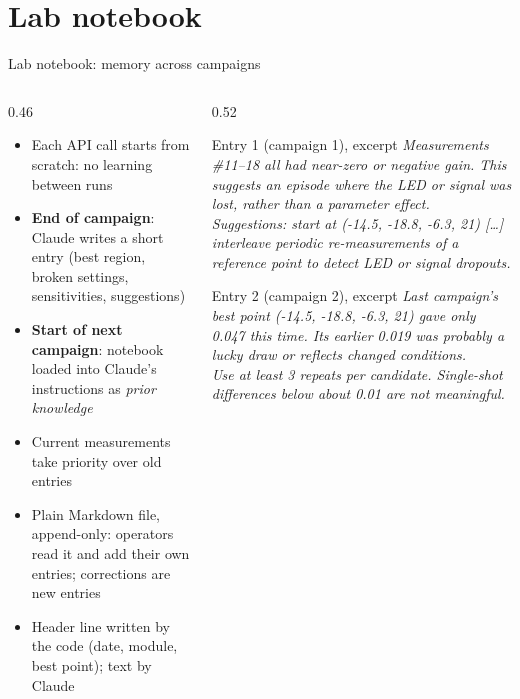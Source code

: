 \documentclass[aspectratio=169,10pt]{beamer}
\begin{document}
\section{Lab notebook}

\begin{frame}{Lab notebook: memory across campaigns}
  \begin{columns}[T]
    \begin{column}{0.46\textwidth}
      \small
      \begin{itemize}
        \item Each API call starts from scratch: no learning between runs
        \item \textbf{End of campaign}: Claude writes a short entry
              (best region, broken settings, sensitivities, suggestions)
        \item \textbf{Start of next campaign}: notebook loaded into Claude's
              instructions as \emph{prior knowledge}
        \item Current measurements take priority over old entries
        \item Plain Markdown file, append-only: operators read it and add their own entries; corrections are new entries
        \item Header line written by the code (date, module, best point);
              text by Claude
      \end{itemize}
    \end{column}
    \begin{column}{0.52\textwidth}
      \scriptsize
      \begin{block}{Entry 1 (campaign 1), excerpt}
        \emph{Measurements \#11--18 all had near-zero or negative gain. This suggests an
        episode where the LED or signal was lost, rather than a parameter effect.}\\[1mm]
        \emph{Suggestions: start at (-14.5, -18.8, -6.3, 21) [\dots] interleave periodic
        re-measurements of a reference point to detect LED or signal dropouts.}
      \end{block}
      \vspace{1mm}
      \begin{block}{Entry 2 (campaign 2), excerpt}
        \emph{Last campaign's best point (-14.5, -18.8, -6.3, 21) gave only 0.047 this
        time. Its earlier 0.019 was probably a lucky draw or reflects changed conditions.}\\[1mm]
        \emph{Use at least 3 repeats per candidate. Single-shot differences below about
        0.01 are not meaningful.}
      \end{block}
    \end{column}
  \end{columns}
\end{frame}
\end{document}
